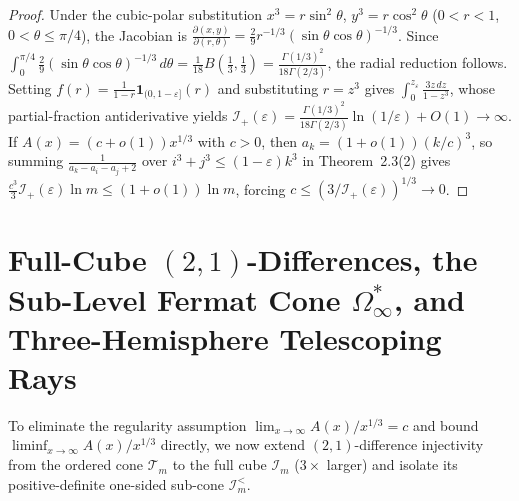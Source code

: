 \documentclass[11pt,a4paper]{article}
\theoremstyle{remark}
\begin{document}
\begin{proof}
Under the cubic-polar substitution $x^3 = r \sin^2\theta$, $y^3 = r \cos^2\theta$ ($0 < r < 1$, $0 < \theta \le \pi/4$), the Jacobian is $\frac{\partial(x,y)}{\partial(r,\theta)} = \frac{2}{9} r^{-1/3} (\sin\theta\cos\theta)^{-1/3}$. Since $\int_0^{\pi/4} \frac{2}{9}(\sin\theta\cos\theta)^{-1/3}\,d\theta = \frac{1}{18} B(\frac{1}{3}, \frac{1}{3}) = \frac{\Gamma(1/3)^2}{18\Gamma(2/3)}$, the radial reduction follows. Setting $f(r) = \frac{1}{1 - r}\mathbf{1}_{(0, 1-\varepsilon]}(r)$ and substituting $r = z^3$ gives $\int_0^{z_\varepsilon} \frac{3z\,dz}{1 - z^3}$, whose partial-fraction antiderivative yields $\mathcal{I}_+(\varepsilon) = \frac{\Gamma(1/3)^2}{18\Gamma(2/3)}\ln(1/\varepsilon) + O(1) \to \infty$. If $A(x) = (c + o(1))x^{1/3}$ with $c > 0$, then $a_k = (1 + o(1))(k/c)^3$, so summing $\frac{1}{a_k - a_i - a_j + 2}$ over $i^3 + j^3 \le (1-\varepsilon)k^3$ in Theorem~2.3(2) gives $\frac{c^3}{3}\mathcal{I}_+(\varepsilon)\ln m \le (1 + o(1))\ln m$, forcing $c \le (3/\mathcal{I}_+(\varepsilon))^{1/3} \to 0$.
\end{proof}

\section{Full-Cube $(2,1)$-Differences, the Sub-Level Fermat Cone $\Omega_\infty^*$, and Three-Hemisphere Telescoping Rays}

To eliminate the regularity assumption $\lim_{x\to\infty} A(x)/x^{1/3} = c$ and bound $\liminf_{x\to\infty} A(x)/x^{1/3}$ directly, we now extend $(2,1)$-difference injectivity from the ordered cone $\mathcal{T}_m$ to the full cube $\mathcal{I}_m$ ($3\times$ larger) and isolate its positive-definite one-sided sub-cone $\mathcal{I}_m^{<}$.
\end{document}
